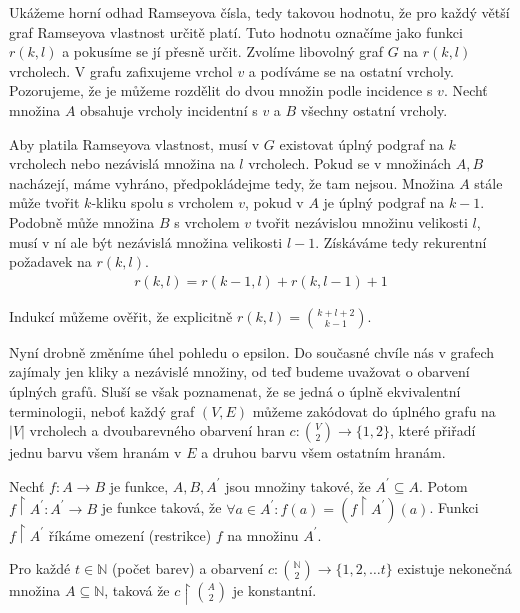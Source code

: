 \begin{t_proof}
  Ukážeme horní odhad Ramseyova čísla, tedy takovou hodnotu, že pro každý větší graf Ramseyova vlastnost určitě platí. Tuto hodnotu označíme jako funkci $r(k,l)$ a pokusíme se jí přesně určit. Zvolíme libovolný graf $G$ na $r(k,l)$ vrcholech. V grafu zafixujeme vrchol $v$ a podíváme se na ostatní vrcholy. Pozorujeme, že je můžeme rozdělit do dvou množin podle incidence s $v$. Nechť množina $A$ obsahuje vrcholy incidentní s $v$ a $B$ všechny ostatní vrcholy.
  
  Aby platila Ramseyova vlastnost, musí v $G$ existovat úplný podgraf na $k$ vrcholech nebo nezávislá množina na $l$ vrcholech. Pokud se v množinách $A,B$ nacházejí, máme vyhráno, předpokládejme tedy, že tam nejsou. Množina $A$ stále může tvořit $k$-kliku spolu s vrcholem $v$, pokud v $A$ je úplný podgraf na $k-1$. Podobně může množina $B$ s vrcholem $v$ tvořit nezávislou množinu velikosti $l$, musí v ní ale být nezávislá množina velikosti $l-1$. Získáváme tedy rekurentní požadavek na $r(k,l)$.
  \begin{align*}
    r(k,l)=r(k-1,l)+r(k,l-1)+1
  \end{align*}

  Indukcí můžeme ověřit, že explicitně $r(k,l)=\binom{k+l+2}{k-1}$.
\end{t_proof}

Nyní drobně změníme úhel pohledu o epsilon. Do současné chvíle nás v grafech zajímaly jen kliky a nezávislé množiny, od teď budeme uvažovat o obarvení úplných grafů. Sluší se však poznamenat, že se jedná o úplně ekvivalentní terminologii, neboť každý graf $(V,E)$ můžeme zakódovat do úplného grafu na $|V|$ vrcholech a dvoubarevného obarvení hran $c:\binom{V}{2}\rightarrow\{1,2\}$, které přiřadí jednu barvu všem hranám v $E$ a druhou barvu všem ostatním hranám.  

\begin{t_definition}
  Nechť $f:A\rightarrow B$ je funkce, $A,B,A^\prime$ jsou množiny takové, že $A^\prime\subseteq A$. Potom $f\restriction A^\prime: A^\prime\rightarrow B$ je funkce taková, že $\forall a\in A^\prime:f(a)=(f\restriction A^\prime)(a)$. Funkci $f\restriction A^\prime$ říkáme omezení (restrikce) $f$ na množinu $A^\prime$.
\end{t_definition}

\begin{t_theorem}
  Pro každé $t\in\mathbb{N}$ (počet barev) a obarvení $c:\binom{\mathbb{N}}{2}\rightarrow\{1,2,\dots t\}$ existuje nekonečná množina $A\subseteq\mathbb{N}$, taková že $c\restriction\binom{A}{2}$ je konstantní.
\end{t_theorem}

